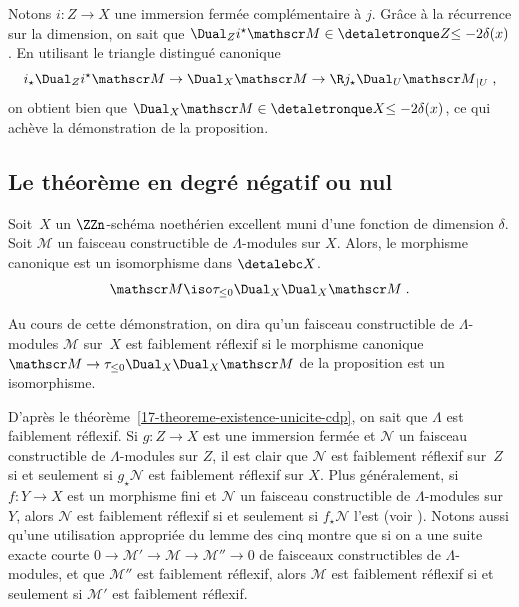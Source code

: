 \documentclass[10pt]{../fichiers-configuration-latex/smfart}
\begin{document}
Notons $i\colon Z\to X$ une immersion fermée complémentaire à $j$. Grâce à
la récurrence sur la dimension, on sait que 
$\Dual_Zi^\star \mathscr  M\in\detaletronque Z {\leq -2\delta(x)}$. En utilisant le
triangle distingué canonique
\[i_\star \Dual_Zi^\star {\mathscr M}\to \Dual_X\mathscr M\to
\R j_\star \Dual_U{\mathscr M}_{|U}\;\text{,}\]
on obtient bien que $\Dual_X\mathscr M\in\detaletronque X {\leq -2\delta(x)}$, ce
qui achève la démonstration de la proposition.

\subsection{Le théorème en degré négatif ou nul}%

\begin{proposition2}\label{17-proposition-dualite-locale-degre-negatif}
Soit $X$ un $\ZZn$-schéma noethérien excellent muni d'une fonction de
dimension $\delta$. Soit $\mathscr M$ un faisceau constructible de
$\Lambda$-modules sur $X$. Alors, le morphisme canonique est un
isomorphisme dans $\detalebc X$.
\[\mathscr M\iso \tau_{\leq 0}\Dual_X\Dual_X \mathscr M\;\text{.}\]
\end{proposition2}

Au cours de cette démonstration, on dira qu'un faisceau constructible de
$\Lambda$-modules $\mathscr M$ sur $X$ est faiblement réflexif si le
morphisme canonique $\mathscr M\to \tau_{\leq 0}\Dual_X\Dual_X \mathscr
M$ de la proposition est un isomorphisme.

D'après le théorème~\ref{17-theoreme-existence-unicite-cdp}, on sait que
$\Lambda$ est faiblement réflexif. Si $g\colon Z\to X$ est une immersion
fermée et $\mathscr N$ un faisceau constructible de $\Lambda$-modules sur
$Z$, il est clair que $\mathscr N$ est faiblement réflexif sur $Z$ si et
seulement si $g_\star \mathscr N$ est faiblement réflexif sur $X$. Plus
généralement, si $f\colon Y\to X$ est un morphisme fini et $\mathscr N$ un
faisceau constructible de $\Lambda$-modules sur $Y$, alors $\mathscr N$ est
faiblement réflexif si et seulement si $f_\star \mathscr N$
l'est (voir ). Notons aussi qu'une utilisation
appropriée du lemme des cinq montre que si on a une suite
exacte courte $0\to {\mathscr M}' \to \mathscr M\to {\mathscr M}''\to 0$ de
faisceaux constructibles de $\Lambda$-modules, et que ${\mathscr M}''$ est
faiblement réflexif, alors $\mathscr M$ est faiblement réflexif si et
seulement si ${\mathscr M}'$ est faiblement réflexif.
\end{document}
